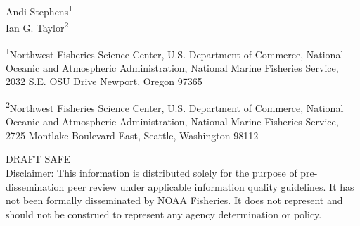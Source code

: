 
\begin{center}
\thispagestyle{empty}


\vspace{.5cm}




Andi Stephens\textsuperscript{1}\\
Ian G. Taylor\textsuperscript{2}\\

\vspace{.5cm}

\small
\textsuperscript{1}Northwest Fisheries Science Center, U.S. Department of Commerce, National Oceanic and Atmospheric Administration, National Marine Fisheries Service, 2032 S.E. OSU Drive Newport, Oregon 97365\\

\vspace{.3cm}

\textsuperscript{2}Northwest Fisheries Science Center, U.S. Department of Commerce, National Oceanic and Atmospheric Administration, National Marine Fisheries Service, 2725 Montlake Boulevard East, Seattle, Washington 98112\\


\vspace{.5cm}

\vfill
DRAFT SAFE\\
Disclaimer: This information is distributed solely for the purpose of pre-dissemination
peer review under applicable information quality guidelines. It has not been formally
disseminated by NOAA Fisheries. It does not represent and should not be construed to
represent any agency determination or policy. 

\vspace{.3cm}

\maketitle

\setcounter{page}{1}
\end{center}


